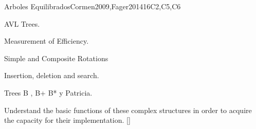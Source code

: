 \begin{syllabus}
\begin{unit}{Arboles Equilibrados}{}{Cormen2009,Fager2014}{16}{C2,C5,C6}
   \begin{topics}
        \item AVL Trees.
	\item Measurement of Efficiency.
	\item Simple and Composite Rotations
	\item Insertion, deletion and search.
	\item Trees B , B+ B* y Patricia.
   \end{topics}

   \begin{learningoutcomes}
      \item Understand the basic functions of these complex structures in order to acquire the capacity for their implementation. [\Assessment]
   \end{learningoutcomes}
\end{unit}

\begin{coursebibliography}
\end{coursebibliography}

\end{syllabus}
